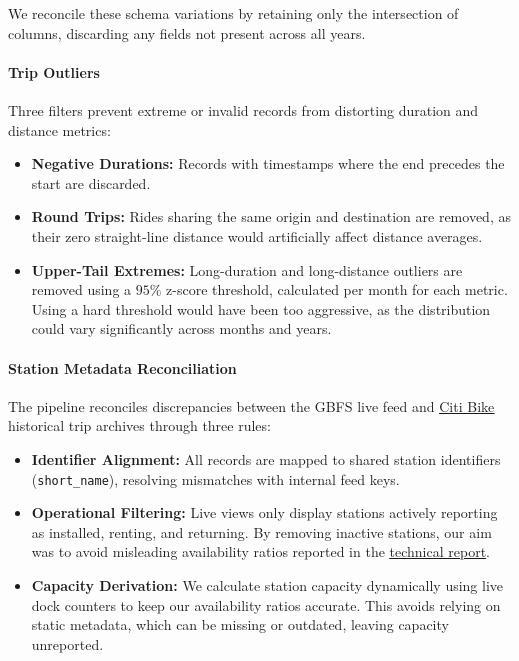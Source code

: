 We reconcile these schema variations by retaining only the intersection of columns, discarding any fields not present across all years.

\paragraph{Trip Outliers}
Three filters prevent extreme or invalid records from distorting duration and distance metrics:
\begin{itemize}
    \item \textbf{Negative Durations:} Records with timestamps where the end precedes the start are discarded.
    \item \textbf{Round Trips:} Rides sharing the same origin and destination are removed, as their zero straight-line distance would artificially affect distance averages.
    \item \textbf{Upper-Tail Extremes:} Long-duration and long-distance outliers are removed using a $95\%$ z-score threshold, calculated per month for each metric.
    Using a hard threshold would have been too aggressive, as the distribution could vary significantly across months and years.
\end{itemize}

\paragraph{Station Metadata Reconciliation}
The pipeline reconciles discrepancies between the GBFS live feed and \href{https://www.citibikenyc.com/system-data}{\underline{Citi Bike}} historical trip archives through three rules:
\begin{itemize}
    \item \textbf{Identifier Alignment:} All records are mapped to shared station identifiers (\texttt{short\_name}), resolving mismatches with internal feed keys.
    \item \textbf{Operational Filtering:} Live views only display stations actively reporting as installed, renting, and returning.
    By removing inactive stations, our aim was to avoid misleading availability ratios reported in the \href{https://github.com/davide-dona/nyc-bike-data-visualization/blob/main/docs/technical-report.pdf}{\underline{technical report}}.
    \item \textbf{Capacity Derivation:} We calculate station capacity dynamically using live dock counters to keep our availability ratios accurate.
    This avoids relying on static metadata, which can be missing or outdated, leaving capacity unreported.
\end{itemize}

